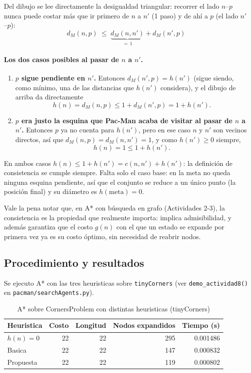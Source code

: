 Del dibujo se lee directamente la desigualdad triangular: recorrer el lado $n$--$p$ nunca puede
costar más que ir primero de $n$ a $n'$ (1 paso) y de ahí a $p$ (el lado $n'$--$p$):
$$d_M(n,p) \;\le\; \underbrace{d_M(n,n')}_{=\,1} + d_M(n',p)$$

\paragraph{Los dos casos posibles al pasar de $n$ a $n'$.}

\begin{enumerate}[label=\textbf{Caso \arabic*:}, leftmargin=2.2cm]
  \item \textbf{$p$ sigue pendiente en $n'$.} Entonces $d_M(n',p) = h(n')$ (sigue siendo, como
  mínimo, una de las distancias que $h(n')$ considera), y el dibujo de arriba da directamente
  $$h(n) = d_M(n,p) \le 1 + d_M(n',p) = 1 + h(n').$$
  \item \textbf{$p$ era justo la esquina que Pac-Man acaba de visitar al pasar de $n$ a $n'$.}
  Entonces $p$ ya no cuenta para $h(n')$, pero en ese caso $n$ y $n'$ son vecinos directos, así que
  $d_M(n,p) = d_M(n,n') = 1$, y como $h(n') \ge 0$ siempre,
  $$h(n) = 1 \le 1 + h(n').$$
\end{enumerate}

En ambos casos $h(n) \le 1 + h(n') = c(n,n') + h(n')$: la definición de consistencia se cumple
siempre. Falta solo el caso base: en la meta no queda ninguna esquina pendiente, así que el
conjunto se reduce a un único punto (la posición final) y su diámetro es $h(\text{meta}) = 0$.

Vale la pena notar que, en A* con búsqueda en grafo (Actividades 2-3), la consistencia es la
propiedad que realmente importa: implica admisibilidad, y además garantiza que el costo $g(n)$ con
el que un estado se expande por primera vez ya es su costo óptimo, sin necesidad de reabrir nodos.

\subsection{Procedimiento y resultados}

Se ejecuto A* con las tres heuristicas sobre \texttt{tinyCorners} (ver \texttt{demo\_actividad8()}
en \texttt{pacman/searchAgents.py}).

\begin{table}[H]
\centering
\caption{A* sobre CornersProblem con distintas heuristicas (tinyCorners)}
\label{tab:act8-heuristicas}
\begin{tabular}{lrrrr}
\toprule
\textbf{Heuristica} & \textbf{Costo} & \textbf{Longitud} & \textbf{Nodos expandidos} & \textbf{Tiempo (s)} \\
\midrule
$h(n)=0$              & 22 & 22 & 295 & 0.001486 \\
Basica                & 22 & 22 & 147 & 0.000832 \\
Propuesta             & 22 & 22 & 119 & 0.000802 \\
\bottomrule
\end{tabular}
\end{table}

